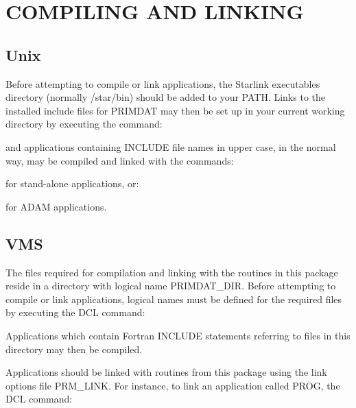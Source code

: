 \documentclass[11pt,nolof]{starlink}
\providecommand{\name}[1]{#1}
\begin{document}
\newpage
\section{COMPILING AND LINKING}

\subsection{Unix}
\label{compunix}
Before attempting to compile or link applications, the Starlink
executables directory (normally /star/bin) should be added to your PATH.
Links to the installed include files for PRIMDAT may then be set up
in your current working directory by executing the command:

\begin{terminalv}
\end{terminalv}

and applications containing INCLUDE file names in upper case, in the normal way,
may be compiled and linked with the commands:

\begin{terminalv}
\end{terminalv}

for stand-alone applications, or:

\begin{terminalv}
\end{terminalv}

for ADAM applications.

\subsection{VMS}
The files required for compilation and linking with the routines in this
package reside in a directory with logical name \name{PRIMDAT\_DIR}.
Before attempting to compile or link applications, logical names must be
defined for the required files by executing the \name{DCL} command:


Applications which contain Fortran \name{INCLUDE} statements referring to
files in this directory may then be compiled.

Applications should be linked with routines from this package using the link
options file \name{PRM\_LINK}.
For instance, to link an application called \name{PROG}, the \name{DCL}
command:
\end{document}
